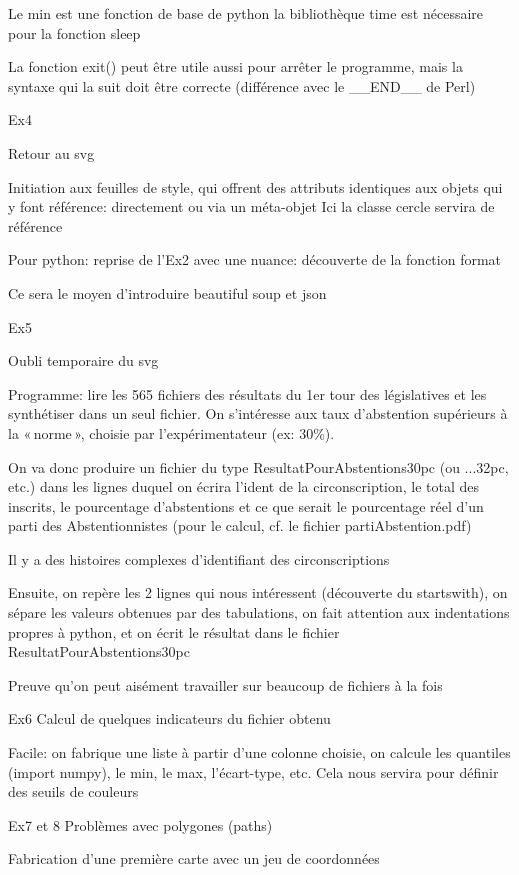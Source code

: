 Le min est une fonction de base de python
la bibliothèque time est nécessaire pour la fonction sleep

La fonction exit() peut être utile aussi pour arrêter le programme, mais la syntaxe qui la suit doit être correcte (différence avec le __END__ de Perl)

Ex4

Retour au svg

Initiation aux feuilles de style, qui offrent des attributs identiques aux objets qui y font référence: directement ou via un méta-objet
Ici la classe cercle servira de référence

Pour python: reprise de l'Ex2 avec une nuance: découverte de la fonction format

Ce sera le moyen d'introduire beautiful soup et json

Ex5 

Oubli temporaire du svg

Programme: lire les 565 fichiers des résultats du 1er tour des législatives
et les synthétiser dans un seul fichier. On s'intéresse aux taux d'abstention supérieurs à la «\,norme\,», choisie par l'expérimentateur (ex: 30\%).

On va donc produire un fichier du type ResultatPourAbstentions30pc (ou ...32pc, etc.) dans les lignes duquel on écrira 
l'ident de la circonscription, le total des inscrits, le pourcentage d'abstentions et ce que serait le pourcentage réel d'un parti des Abstentionnistes (pour le calcul, cf. le fichier partiAbstention.pdf)

Il y a des histoires complexes d'identifiant des circonscriptions

Ensuite, on repère les 2 lignes qui nous intéressent (découverte du startswith), on sépare les valeurs obtenues par des tabulations, on fait attention aux indentations propres à python, et on écrit le résultat dans le fichier ResultatPourAbstentions30pc

Preuve qu'on peut aisément travailler sur beaucoup de fichiers à la fois

Ex6
Calcul de quelques indicateurs du fichier obtenu

Facile: on fabrique une liste à partir d'une colonne choisie,
on calcule les quantiles (import numpy), le min, le max, l'écart-type, etc.
Cela nous servira pour définir des seuils de couleurs 

Ex7 et 8
Problèmes avec polygones (paths)

Fabrication d'une première carte avec un jeu de coordonnées







